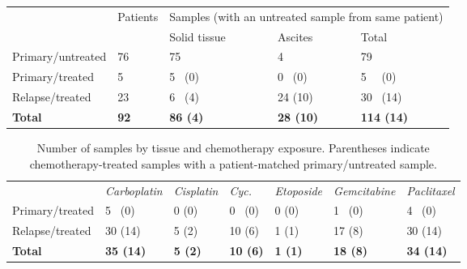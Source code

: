 \documentclass[linenumbers]{bmcart}
\begin{document}

\begin{table}[]
\centering
\begin{tabular}{lllll}
                  & Patients & \multicolumn{3}{c}{Samples (with an untreated sample from same patient)} \\
                  &          & Solid tissue              & Ascites              & Total                 \\
Primary/untreated & 76       & 75                        & 4                    & 79                    \\
Primary/treated   & 5        & 5 \, (0)                     & 0 \, (0)                & 5 \, \, (0)                 \\
Relapse/treated   & 23       & 6 \, (4)                     & 24 (10)              & 30 \, (14)               \\
\textbf{Total}             & \textbf{92}       & \textbf{86 (4)}                    & \textbf{28 (10)}              & \textbf{114 (14)}             
\end{tabular}
\end{table}


\begin{table}[]
\centering
\begin{tabular}{lllllll}
                & \textit{Carboplatin} & \textit{Cisplatin} & \textit{Cyc.}   & \textit{Etoposide} & \textit{Gemcitabine} & \textit{Paclitaxel} \\
Primary/treated & 5 \, (0)                & 0 (0)              & 0  \, (0)              & 0 (0)                 & 1 \, (0)                & 4 \, (0)               \\
Relapse/treated & 30 (14)              & 5 (2)              & 10 (6)          & 1 (1)              & 17 (8)               & 30 (14)             \\
\textbf{Total}  & \textbf{35 (14)}     & \textbf{5 (2)}     & \textbf{10 (6)} & \textbf{1 (1)}     & \textbf{18 (8)}      & \textbf{34 (14)}   
\end{tabular}
\hspace{\linewidth}
\caption{Number of samples by tissue and chemotherapy exposure. Parentheses indicate chemotherapy-treated samples with a patient-matched primary/untreated sample.}\label{tab:samples}

\end{table}
\end{document}
